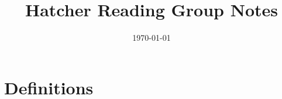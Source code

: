 \documentclass[a4paper,10pt]{article}
\title{Hatcher Reading Group Notes}
\date{\today}
\begin{document}
\maketitle

\section*{Definitions}

\end{document}
